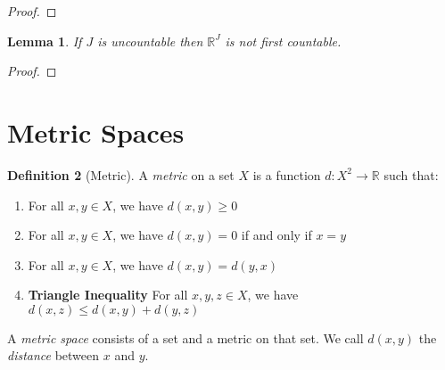 \documentclass{book}
\newtheorem{lm}{Lemma}[chapter]
\theoremstyle{definition}
\newtheorem{df}[lm]{Definition}
\begin{document}
  \begin{proof}
  \end{proof}
  
  \begin{lm}
    If $J$ is uncountable then $\mathbb{R}^J$ is not first countable.
  \end{lm}
  
  \begin{proof}
  \end{proof}
  
  \section{Metric Spaces}
  
  \begin{df}[Metric]
    A \emph{metric} on a set $X$ is a function $d : X^2 \rightarrow \mathbb{R}$ 
    such that:
    \begin{enumerate}
      \item For all $x, y \in X$, we have $d(x,y) \geq 0$
      \item For all $x, y \in X$, we have $d(x, y) = 0$ if and only if $x = y$
      \item For all $x, y \in X$, we have $d(x, y) = d(y, x)$
      \item \textbf{Triangle Inequality} For all $x, y, z \in X$, we have $d(x, 
      z) 
      \leq d(x, y) + d(y, z)$
    \end{enumerate}
    
    A \emph{metric space} consists of a set and a metric on that set. We call 
    $d(x, 
    y)$ the \emph{distance} between $x$ and $y$.
  \end{df}
  
\end{document}
